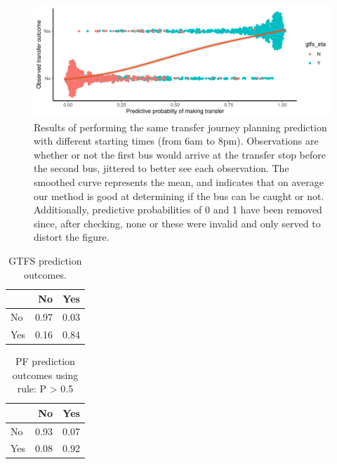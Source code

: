 \begin{knitrout}\small
{}\color{fgcolor}\begin{figure}

{\centering \includegraphics[width=\textwidth]{figure/eta_journey_transfer_many-1} 

}

\caption[Results of performing the same transfer journey planning prediction with different starting times (from 6am to 8pm)]{Results of performing the same transfer journey planning prediction with different starting times (from 6am to 8pm). Observations are whether or not the first bus would arrive at the transfer stop before the second bus, jittered to better see each observation. The smoothed curve represents the mean, and indicates that on average our method is good at determining if the bus can be caught or not. Additionally, predictive probabilities of 0 and 1 have been removed since, after checking, none or these were invalid and only served to distort the figure.}\label{fig:eta_journey_transfer_many}
\end{figure}

\begin{table}

\caption{\label{tab:eta_journey_transfer_many}GTFS prediction outcomes.}
\centering
\fontsize{8}{10}\selectfont
\begin{tabular}[t]{lrr}
\toprule
  & No & Yes\\
\midrule
No & 0.97 & 0.03\\
Yes & 0.16 & 0.84\\
\bottomrule
\end{tabular}
\end{table}


\end{knitrout}

\begin{knitrout}\small
{}\color{fgcolor}\begin{table}

\caption{\label{tab:eta_journey_transfer_many2}PF prediction outcomes using rule: P > 0.5}
\centering
\fontsize{8}{10}\selectfont
\begin{tabular}[t]{lrr}
\toprule
  & No & Yes\\
\midrule
No & 0.93 & 0.07\\
Yes & 0.08 & 0.92\\
\bottomrule
\end{tabular}
\end{table}


\end{knitrout}



